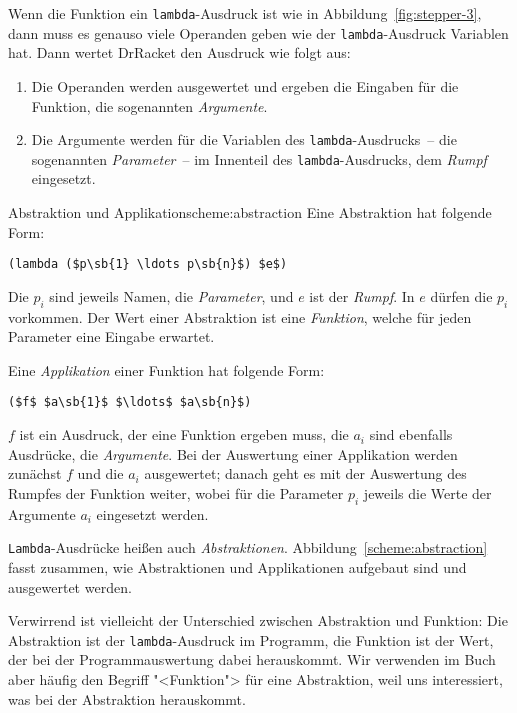 Wenn die Funktion ein \lstinline{lambda}-Ausdruck ist wie in
Abbildung~\ref{fig:stepper-3}, dann muss es genauso viele Operanden
geben wie der \lstinline{lambda}-Ausdruck Variablen hat.
Dann wertet DrRacket den Ausdruck wie folgt aus:
%
\begin{enumerate}
\item Die Operanden werden ausgewertet und ergeben die Eingaben für
  die Funktion, die sogenannten
  \textit{Argumente}.\label{sec:argument}
\item Die Argumente werden für die
  Variablen des \lstinline{lambda}-Ausdrucks~-- die sogenannten
  \textit{Parameter}~-- im Innenteil des
  \lstinline{lambda}-Ausdrucks, dem \textit{Rumpf}
  eingesetzt.
\end{enumerate}
%
\begin{feature}{Abstraktion und Applikation}{scheme:abstraction}
  Eine Abstraktion hat folgende Form:
\begin{lstlisting}
(lambda ($p\sb{1} \ldots p\sb{n}$) $e$)
\end{lstlisting}
  Die $p_i$ sind jeweils Namen, die \textit{Parameter}, und
  $e$ ist der \textit{Rumpf}.  In $e$ dürfen die $p_i$
  vorkommen.  Der Wert einer Abstraktion ist eine \textit{Funktion},
  welche für jeden Parameter eine Eingabe erwartet.

  Eine \textit{Applikation} einer Funktion hat folgende Form:
\begin{lstlisting}
($f$ $a\sb{1}$ $\ldots$ $a\sb{n}$)
\end{lstlisting}
  $f$ ist ein Ausdruck, der eine Funktion ergeben muss, die $a_i$ sind
  ebenfalls Ausdrücke, die \textit{Argumente}.  Bei
  der Auswertung einer Applikation werden zunächst $f$ und die $a_i$
  ausgewertet; danach geht es mit der Auswertung des Rumpfes der
  Funktion weiter, wobei für die Parameter $p_i$ jeweils die Werte der
  Argumente $a_i$ eingesetzt werden.
\end{feature}
%
\lstinline{Lambda}-Ausdrücke heißen auch
\textit{Abstraktionen}.
Abbildung~\ref{scheme:abstraction} fasst zusammen, wie Abstraktionen
und Applikationen aufgebaut sind und ausgewertet werden.

Verwirrend ist vielleicht der Unterschied zwischen Abstraktion und
Funktion: Die Abstraktion ist der \lstinline{lambda}-Ausdruck im
Programm, die Funktion ist der Wert, der bei der Programmauswertung
dabei herauskommt.  Wir verwenden im Buch aber häufig den Begriff
"<Funktion"> für eine Abstraktion, weil uns interessiert, was bei der
Abstraktion herauskommt.

